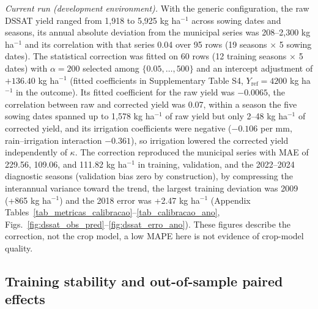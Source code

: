 \documentclass[times,final,authoryear]{elsarticle}
\begin{document}
\emph{Current run (development environment).} With the generic configuration, the raw DSSAT yield ranged from 1,918 to 5,925 kg ha$^{-1}$ across sowing dates and seasons, its annual absolute deviation from the municipal series was 208--2,300 kg ha$^{-1}$ and its correlation with that series 0.04 over 95 rows (19 seasons $\times$ 5 sowing dates). The statistical correction was fitted on 60 rows (12 training seasons $\times$ 5 dates) with $\alpha = 200$ selected among $\{0.05,\dots,500\}$ and an intercept adjustment of $+136.40$ kg ha$^{-1}$ (fitted coefficients in Supplementary Table S4, $Y_{\text{ref}} = 4200$ kg ha$^{-1}$ in the outcome). Its fitted coefficient for the raw yield was $-0.0065$, the correlation between raw and corrected yield was 0.07, within a season the five sowing dates spanned up to 1,578 kg ha$^{-1}$ of raw yield but only 2--48 kg ha$^{-1}$ of corrected yield, and its irrigation coefficients were negative ($-0.106$ per mm, rain--irrigation interaction $-0.361$), so irrigation lowered the corrected yield independently of $\kappa$. The correction reproduced the municipal series with MAE of 229.56, 109.06, and 111.82 kg ha$^{-1}$ in training, validation, and the 2022--2024 diagnostic seasons (validation bias zero by construction), by compressing the interannual variance toward the trend, the largest training deviation was 2009 (+865 kg ha$^{-1}$) and the 2018 error was +2.47 kg ha$^{-1}$ (Appendix Tables~\ref{tab_metricas_calibracao}--\ref{tab_calibracao_ano}, Figs.~\ref{fig:dssat_obs_pred}--\ref{fig:dssat_erro_ano}). These figures describe the correction, not the crop model, a low MAPE here is not evidence of crop-model quality. 

\subsection{Training stability and out-of-sample paired effects}
\label{subres_performance}
\end{document}
